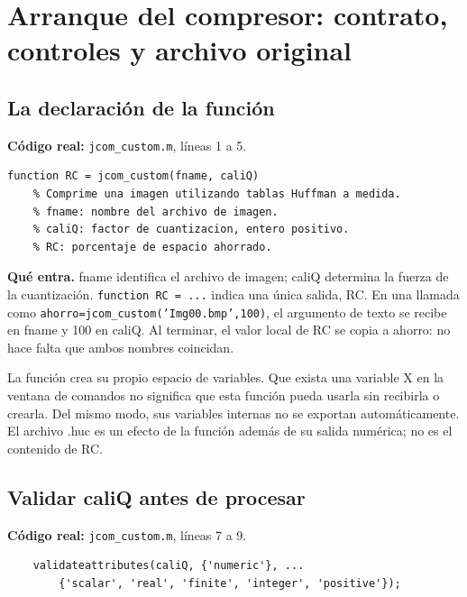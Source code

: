 \documentclass[11pt,a4paper,oneside]{report}
\begin{document}
\section{Arranque del compresor: contrato, controles y archivo original}

\par\medskip\noindent\begin{minipage}{\linewidth}

\subsection{La declaración de la función}

\textbf{Código real:} \texttt{jcom\_custom.m}, líneas 1 a 5.

\begin{lstlisting}[firstnumber=1]
function RC = jcom_custom(fname, caliQ)
    % Comprime una imagen utilizando tablas Huffman a medida.
    % fname: nombre del archivo de imagen.
    % caliQ: factor de cuantizacion, entero positivo.
    % RC: porcentaje de espacio ahorrado.
\end{lstlisting}

\end{minipage}\par


\textbf{Qué entra.} fname identifica el archivo de imagen; caliQ determina
la fuerza de la cuantización. \texttt{function RC = ...} indica una única
salida, RC. En una llamada como \texttt{ahorro=jcom\_custom('Img00.bmp',100)},
el argumento de texto se recibe en fname y 100 en caliQ. Al terminar, el valor
local de RC se copia a ahorro: no hace falta que ambos nombres coincidan.

La función crea su propio espacio de variables. Que exista una variable X
en la ventana de comandos no significa que esta función pueda usarla sin
recibirla o crearla. Del mismo modo, sus variables internas no se exportan
automáticamente. El archivo .huc es un efecto de la función además de su
salida numérica; no es el contenido de RC.


\par\medskip\noindent\begin{minipage}{\linewidth}

\subsection{Validar caliQ antes de procesar}

\textbf{Código real:} \texttt{jcom\_custom.m}, líneas 7 a 9.

\begin{lstlisting}[firstnumber=7]
    % PASO 1: validar la calidad y preparar los archivos.
    validateattributes(caliQ, {'numeric'}, ...
        {'scalar', 'real', 'finite', 'integer', 'positive'});
\end{lstlisting}

\end{minipage}\par
\end{document}
